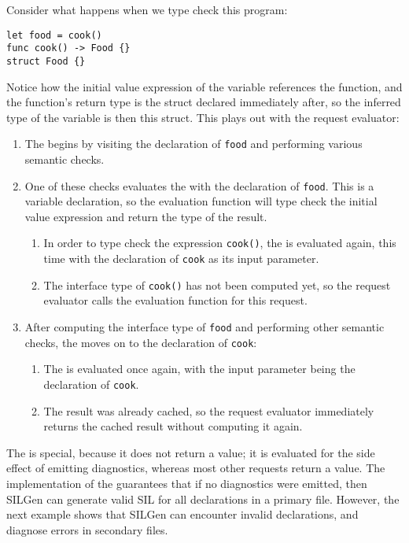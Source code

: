 \documentclass[../generics]{subfiles}
\begin{document}
\begin{example}
Consider what happens when we type check this program:
\begin{Verbatim}
let food = cook()
func cook() -> Food {}
struct Food {}
\end{Verbatim}
Notice how the initial value expression of the variable references the function, and the function's return type is the struct declared immediately after, so the inferred type of the variable is then this struct. This plays out with the request evaluator:
\begin{enumerate}
\item The  begins by visiting the declaration of \texttt{food} and performing various semantic checks.
\item One of these checks evaluates the  with the declaration of \texttt{food}. This is a variable declaration, so the evaluation function will type check the initial value expression and return the type of the result.
\begin{enumerate}
\item In order to type check the expression \texttt{cook()}, the  is evaluated again, this time with the declaration of \texttt{cook} as its input parameter.
\item The interface type of \texttt{cook()} has not been computed yet, so the request evaluator calls the evaluation function for this request.
\end{enumerate}
\item After computing the interface type of \texttt{food} and performing other semantic checks, the  moves on to the declaration of \texttt{cook}:
\begin{enumerate}
\item The  is evaluated once again, with the input parameter being the declaration of \texttt{cook}.
\item The result was already cached, so the request evaluator immediately returns the cached result without computing it again.
\end{enumerate}
\end{enumerate}
\end{example}

The  is special, because it does not return a value; it is evaluated for the side effect of emitting diagnostics, whereas most other requests return a value. The implementation of the  guarantees that if no diagnostics were emitted, then SILGen can generate valid SIL for all declarations in a primary file. However, the next example shows that SILGen can encounter invalid declarations, and diagnose errors in secondary files.
\end{document}
